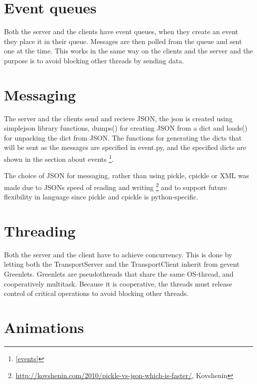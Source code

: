 
\section{Event queues}
Both the server and the clients have event queues, when they create an event they place it in their queue. Messages are then polled from the queue and sent one at the time. This works in the same way on the clients and the server and the purpose is to avoid blocking other threads by sending data.

\section{Messaging}
The server and the clients send and recieve JSON, the json is created using simplejson library functions, dumps() for creating JSON from a dict and loads() for unpacking the dict from JSON. The functions for generating the dicts that will be sent as the messages are specified in event.py, and the specified dicts are shown in the section about events \footnote{\ref{events}}. 

The choice of JSON for messaging, rather than using pickle, cpickle or XML was made due to JSONs speed of reading and writing \footnote{\url{http://kovshenin.com/2010/pickle-vs-json-which-is-faster/}, Kovshenin} and to support future flexibility in language since pickle and cpickle is python-specific. 



\section{Threading}
\label{sec:threading}

Both the server and the client have to achieve concurrency. This is done by letting both the TransportServer and the TransportClient inherit from gevent Greenlets. 
Greenlets are pseudothreads that share the same OS-thread, and cooperatively multitask. Because it is cooperative, the threads must release control of critical operations to avoid blocking other threads. 

\section{Animations}

